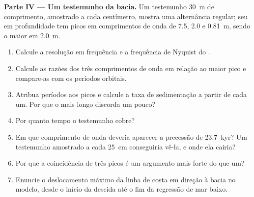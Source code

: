 \begin{problem}
\medskip\noindent\textbf{Parte IV --- Um testemunho da bacia.} Um testemunho
\qty{30}{m} de comprimento, amostrado a cada centímetro, mostra uma alternância regular; seu
   em profundidade tem picos em comprimentos de onda de 7.5, 2.0 e \qty{0.81}{m},
  sendo o maior em \qty{2.0}{m}.
\begin{enumerate}[resume]
\item Calcule a resolução em frequência e a frequência de Nyquist do
  .
\item Calcule as razões dos três comprimentos de onda em relação ao maior pico e
  compare-as com os períodos orbitais.
\item Atribua períodos aos picos e calcule a taxa de sedimentação a partir de
  cada um. Por que o mais longo discorda um pouco?
\item Por quanto tempo o testemunho cobre?
\item Em que comprimento de onda deveria aparecer a precessão de \qty{23.7}{kyr}?
  Um testemunho amostrado a cada \qty{25}{cm} conseguiria vê-la, e onde ela cairia?
\item Por que a coincidência de três picos é um argumento mais forte do que um?
\item Enuncie o deslocamento máximo da linha de costa em direção à bacia no modelo, desde
  o início da descida até o fim da regressão de mar baixo.
\end{enumerate}
\end{problem}
